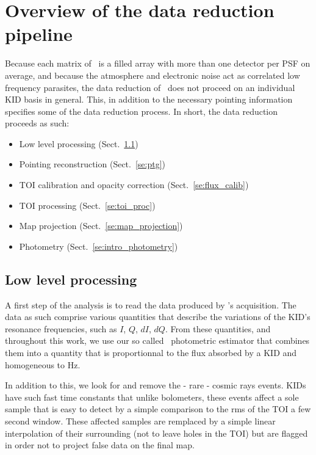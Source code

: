 

\section{Overview of the data reduction pipeline}%
\label{se:pipeline_overview}

Because each matrix of \nika\ is a filled array with more than one
detector per  PSF on average, and because the atmosphere and electronic noise act as
correlated low frequency parasites, the data reduction of \nika\ does not
proceed on an individual KID basis in general. This, in addition to the
necessary pointing information specifies some of the data reduction
process. In short, the data reduction proceeds as such:

\begin{itemize}
\item Low level processing (Sect.~\ref{se:ll_proc})
\item Pointing reconstruction (Sect.~\ref{se:ptg})
\item TOI calibration and opacity correction (Sect.~\ref{se:flux_calib})
\item TOI processing (Sect.~\ref{se:toi_proc})
\item Map projection (Sect.~\ref{se:map_projection})
\item Photometry (Sect.~\ref{se:intro_photometry})
\end{itemize}

\subsection{Low level processing}
\label{se:ll_proc}

A first step of the analysis is to read the data produced by \nika's
acquisition. The data as such comprise various quantities that describe the
variations of the KID's resonance frequencies, such as $I$, $Q$, $dI$,
$dQ$. From these quantities, and throughout this work, we use our so called
\rf\ photometric estimator that combines them into a quantity that is
proportionnal to the flux absorbed by a KID \cite{Calvo13} and homogeneous to Hz.

In addition to this, we look for and remove the - rare - cosmic rays
events. KIDs have such fast time constants that unlike bolometers, these events
affect a sole sample that is easy to detect by a simple comparison to the rms of
the TOI a few second window. These affected samples are remplaced by a simple
linear interpolation of their surrounding (not to leave holes in the TOI) but
are flagged in order not to project false data on the final map.

